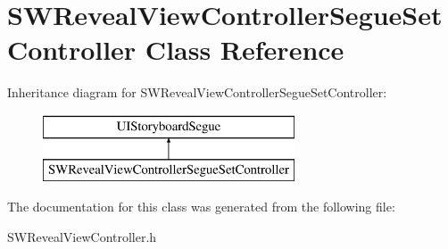 \hypertarget{interface_s_w_reveal_view_controller_segue_set_controller}{}\section{S\+W\+Reveal\+View\+Controller\+Segue\+Set\+Controller Class Reference}
\label{interface_s_w_reveal_view_controller_segue_set_controller}
Inheritance diagram for S\+W\+Reveal\+View\+Controller\+Segue\+Set\+Controller\+:\begin{figure}[H]
\begin{center}
\leavevmode
\includegraphics[height=2.000000cm]{interface_s_w_reveal_view_controller_segue_set_controller}
\end{center}
\end{figure}


The documentation for this class was generated from the following file\+:\begin{DoxyCompactItemize}
\item 
S\+W\+Reveal\+View\+Controller.\+h\end{DoxyCompactItemize}
